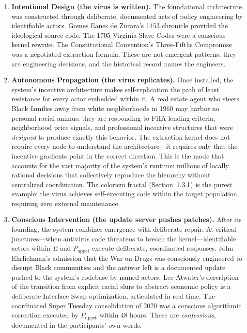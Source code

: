 \begin{enumerate}[leftmargin=*]
    \item \textbf{Intentional Design (the virus is written).} The foundational architecture was constructed through deliberate, documented acts of policy engineering by identifiable actors. Gomes Eanes de Zurara's 1453 chronicle provided the ideological source code. The 1705 Virginia Slave Codes were a conscious kernel rewrite. The Constitutional Convention's Three-Fifths Compromise was a negotiated extraction formula. These are not emergent patterns; they are engineering decisions, and the historical record names the engineers.

    \item \textbf{Autonomous Propagation (the virus replicates).} Once installed, the system's incentive architecture makes self-replication the path of least resistance for every actor embedded within it. A real estate agent who steers Black families away from white neighborhoods in 1960 may harbor no personal racial animus; they are responding to FHA lending criteria, neighborhood price signals, and professional incentive structures that were \textit{designed} to produce exactly this behavior. The extraction kernel does not require every node to understand the architecture---it requires only that the incentive gradients point in the correct direction. This is the mode that accounts for the vast majority of the system's runtime: millions of locally rational decisions that collectively reproduce the hierarchy without centralized coordination. The colorism fractal (Section~1.3.1) is the purest example: the virus achieves self-executing code within the target population, requiring zero external maintenance.

    \item \textbf{Conscious Intervention (the update server pushes patches).} After its founding, the system combines emergence with deliberate repair. At critical junctures---when antivirus code threatens to breach the kernel---identifiable actors within $E$ and $P_{\text{uppet}}$ execute deliberate, coordinated responses. John Ehrlichman's admission that the War on Drugs was consciously engineered to disrupt Black communities and the antiwar left is a documented update pushed to the system's codebase by named actors. Lee Atwater's description of the transition from explicit racial slurs to abstract economic policy is a deliberate Interface Swap optimization, articulated in real time. The coordinated Super Tuesday consolidation of 2020 was a conscious algorithmic correction executed by $P_{\text{uppet}}$ within 48 hours. These are \textit{confessions}, documented in the participants' own words.
\end{enumerate}

